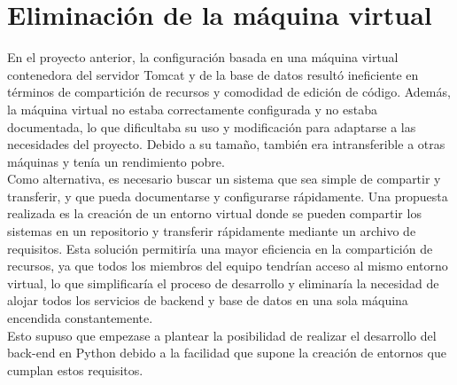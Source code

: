\documentclass[12pt]{report}
\begin{document}
\section{Eliminación de la máquina virtual} %
En el proyecto anterior, la configuración basada en una máquina virtual contenedora del servidor Tomcat y de la base de datos resultó ineficiente en términos de compartición de recursos y comodidad de edición de código. Además, la máquina virtual no estaba correctamente configurada y no estaba documentada, lo que dificultaba su uso y modificación para adaptarse a las necesidades del proyecto. Debido a su tamaño, también era intransferible a otras máquinas y tenía un rendimiento pobre.\\
Como alternativa, es necesario buscar un sistema que sea simple de compartir y transferir, y que pueda documentarse y configurarse rápidamente. Una propuesta realizada es la creación de un entorno virtual donde se pueden compartir los sistemas en un repositorio y transferir rápidamente mediante un archivo de requisitos. Esta solución permitiría una mayor eficiencia en la compartición de recursos, ya que todos los miembros del equipo tendrían acceso al mismo entorno virtual, lo que simplificaría el proceso de desarrollo y eliminaría la necesidad de alojar todos los servicios de backend y base de datos en una sola máquina encendida constantemente.\\
Esto supuso que empezase a plantear la posibilidad de realizar el desarrollo del back-end en Python debido a la facilidad que supone la creación de entornos que cumplan estos requisitos.
\end{document}
